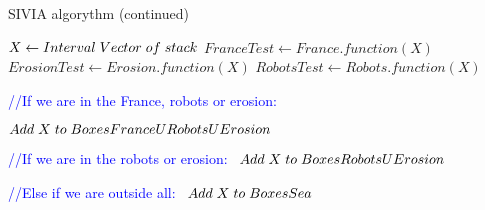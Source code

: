 \begin{algorithm}
  \caption{SIVIA algorythm (continued)}
  \begin{algorithmic}
	
		\vspace{0.3 cm}
	
  		\STATE $X\gets Interval \hspace{0.1cm} Vector \hspace{0.1cm} of \hspace{0.1cm} stack$
		\STATE $FranceTest\gets France.function(X)$
		\STATE $ErosionTest\gets Erosion.function(X)$ 
		\STATE $RobotsTest\gets Robots.function(X)$

		\vspace{0.3 cm}

  	 	\textcolor{blue}{//If we are in the France, robots or erosion:}\
	 	
     	  	\STATE $Add \hspace{0.1cm} X \hspace{0.1cm} to \hspace{0.1cm} BoxesFranceURobotsUErosion$
     	
	 	\vspace{0.3 cm}
	 	
	 	\textcolor{blue}{//If we are in the robots or erosion:}\
     		\STATE $Add \hspace{0.1cm} X \hspace{0.1cm} to \hspace{0.1cm} BoxesRobotsUErosion$
	 	 
	
	 	 \ENDIF
	 	 
	 	 \vspace{0.3 cm}
     		
     	\textcolor{blue}{//Else if we are outside all:}\
	 	 \STATE $Add \hspace{0.1cm} X \hspace{0.1cm} to \hspace{0.1cm} BoxesSea$
	 	 
     	\ELSE
     

\end{algorithmic}
\end{algorithm}
